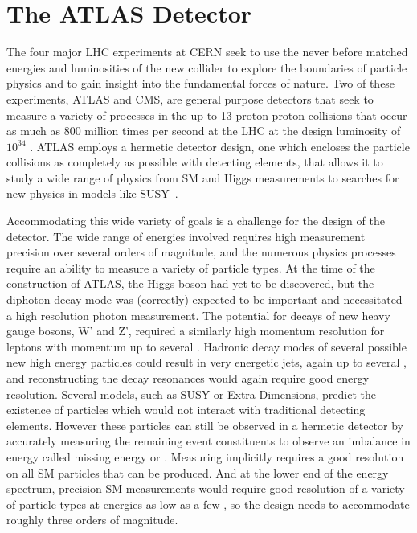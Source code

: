 \chapter{The ATLAS Detector}

\label{ch:atlas}

The four major \ac{LHC} experiments at \ac{CERN} seek to use the never before matched energies and luminosities of the new collider to explore the boundaries of particle physics and to gain insight into the fundamental forces of nature.
Two of these experiments, ATLAS and \ac{CMS}, are general purpose detectors that seek to measure a variety of processes in the up to 13 \TeV proton-proton collisions that occur as much as 800 million times per second at the \ac{LHC} at the design luminosity of $10^{34}$ \lcms. 
ATLAS employs a hermetic detector design, one which encloses the particle collisions as completely as possible with detecting elements, that allows it to study a wide range of physics from \ac{SM} and Higgs measurements to searches for new physics in models like \ac{SUSY}~\cite{atlas_experiment}.

Accommodating this wide variety of goals is a challenge for the design of the detector.
The wide range of energies involved requires high measurement precision over several orders of magnitude, and the numerous physics processes require an ability to measure a variety of particle types.
At the time of the construction of ATLAS, the Higgs boson had yet to be discovered, but the diphoton decay mode was (correctly) expected to be important and necessitated a high resolution photon measurement.
The potential for decays of new heavy gauge bosons, W' and Z', required a similarly high momentum resolution for leptons with momentum up to several \TeV.
Hadronic decay modes of several possible new high energy particles could result in very energetic jets, again up to several \TeV, and reconstructing the decay resonances would again require good energy resolution.
Several models, such as \ac{SUSY} or Extra Dimensions, predict the existence of particles which would not interact with traditional detecting elements. 
However these particles can still be observed in a hermetic detector by accurately measuring the remaining event constituents to observe an imbalance in energy called missing energy or \met. 
Measuring \met implicitly requires a good resolution on all \ac{SM} particles that can be produced.
And at the lower end of the energy spectrum, precision \ac{SM} measurements would require good resolution of a variety of particle types at energies as low as a few \GeV, so the design needs to accommodate roughly three orders of magnitude.

